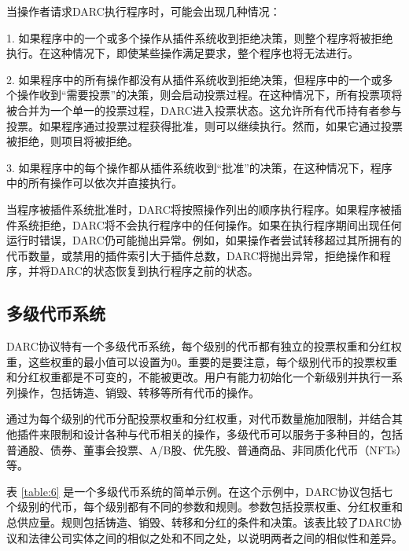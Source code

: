 \documentclass[main.tex]{subfiles}
\begin{document}
当操作者请求DARC执行程序时，可能会出现几种情况：

1. 如果程序中的一个或多个操作从插件系统收到拒绝决策，则整个程序将被拒绝执行。在这种情况下，即使某些操作满足要求，整个程序也将无法进行。

2. 如果程序中的所有操作都没有从插件系统收到拒绝决策，但程序中的一个或多个操作收到“需要投票”的决策，则会启动投票过程。在这种情况下，所有投票项将被合并为一个单一的投票过程，DARC进入投票状态。这允许所有代币持有者参与投票。如果程序通过投票过程获得批准，则可以继续执行。然而，如果它通过投票被拒绝，则项目将被拒绝。

3. 如果程序中的每个操作都从插件系统收到“批准”的决策，在这种情况下，程序中的所有操作可以依次并直接执行。

当程序被插件系统批准时，DARC将按照操作列出的顺序执行程序。如果程序被插件系统拒绝，DARC将不会执行程序中的任何操作。如果在执行程序期间出现任何运行时错误，DARC仍可能抛出异常。例如，如果操作者尝试转移超过其所拥有的代币数量，或禁用的插件索引大于插件总数，DARC将抛出异常，拒绝操作和程序，并将DARC的状态恢复到执行程序之前的状态。

\subsection{多级代币系统}

DARC协议特有一个多级代币系统，每个级别的代币都有独立的投票权重和分红权重，这些权重的最小值可以设置为0。重要的是要注意，每个级别代币的投票权重和分红权重都是不可变的，不能被更改。用户有能力初始化一个新级别并执行一系列操作，包括铸造、销毁、转移等所有代币的操作。

通过为每个级别的代币分配投票权重和分红权重，对代币数量施加限制，并结合其他插件来限制和设计各种与代币相关的操作，多级代币可以服务于多种目的，包括普通股、债券、董事会投票、A/B股、优先股、普通商品、非同质化代币（NFTs）等。

表 \ref{table:6} 是一个多级代币系统的简单示例。在这个示例中，DARC协议包括七个级别的代币，每个级别都有不同的参数和规则。参数包括投票权重、分红权重和总供应量。规则包括铸造、销毁、转移和分红的条件和决策。该表比较了DARC协议和法律公司实体之间的相似之处和不同之处，以说明两者之间的相似性和差异。
\end{document}
